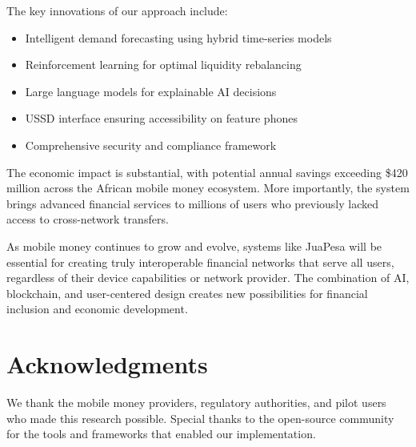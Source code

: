 \documentclass[11pt,a4paper]{article}
\begin{document}
The key innovations of our approach include:
\begin{itemize}
    \item Intelligent demand forecasting using hybrid time-series models
    \item Reinforcement learning for optimal liquidity rebalancing
    \item Large language models for explainable AI decisions
    \item USSD interface ensuring accessibility on feature phones
    \item Comprehensive security and compliance framework
\end{itemize}

The economic impact is substantial, with potential annual savings exceeding \$420 million across the African mobile money ecosystem. More importantly, the system brings advanced financial services to millions of users who previously lacked access to cross-network transfers.

As mobile money continues to grow and evolve, systems like JuaPesa will be essential for creating truly interoperable financial networks that serve all users, regardless of their device capabilities or network provider. The combination of AI, blockchain, and user-centered design creates new possibilities for financial inclusion and economic development.

\section*{Acknowledgments}

We thank the mobile money providers, regulatory authorities, and pilot users who made this research possible. Special thanks to the open-source community for the tools and frameworks that enabled our implementation.



\end{document}
